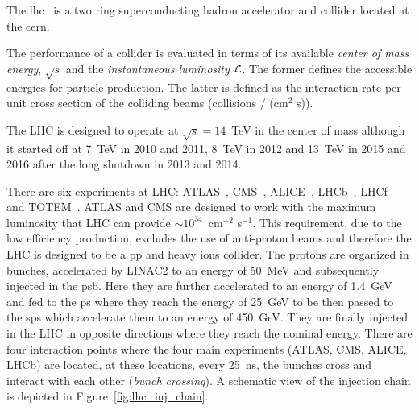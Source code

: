 The \gls{lhc}~\cite{LHC} is a two ring superconducting hadron accelerator and
collider located at the \gls{cern}.

The performance of a collider is evaluated in terms of its available
\emph{center of mass energy}, $\sqrt{s}$ and the \emph{instantaneous luminosity}
$\mathcal{L}$. The former defines the accessible energies for particle production. The
latter is defined as the interaction rate per unit cross section of the
colliding beams (collisions / (cm$^2$ s)).

The LHC is designed to operate at $\sqrt{s} = 14$~TeV in the center of mass
although it started off at 7~TeV in 2010 and 2011, 8~TeV in 2012 and 13~TeV in
2015 and 2016 after the long shutdown in 2013 and 2014.

There are six experiments at LHC: ATLAS~\cite{ATLASPaper},
CMS~\cite{1748-0221-3-08-S08004}, ALICE~\cite{ALICE}, LHCb~\cite{LHCb},
LHCf~\cite{LHCf} and TOTEM~\cite{TOTEM}\@. ATLAS and CMS are designed to work
with the maximum luminosity that LHC can provide $\sim 10^{34}$~cm$^{-2}$
s$^{-1}$. This requirement, due to the low efficiency production, excludes the
use of anti-proton beams and therefore the LHC is designed to be a \gls{pp} and
heavy ions collider. The protons are organized in bunches, accelerated by LINAC2
to an energy of 50~MeV and subsequently injected in the \gls{psb}. Here they are
further accelerated to an energy of 1.4~GeV and fed to the \gls{ps} where they
reach the energy of 25~GeV to be then passed to the \gls{sps} which accelerate
them to an energy of 450~GeV. They are finally injected in the LHC in opposite
directions where they reach the nominal energy. There are four interaction
points where the four main experiments (ATLAS, CMS, ALICE, LHCb) are located, at
these locations, every 25~ns, the bunches cross and interact with each other
(\emph{bunch crossing}). A schematic view of the injection chain is depicted in
Figure~\ref{fig:lhc_inj_chain}.

